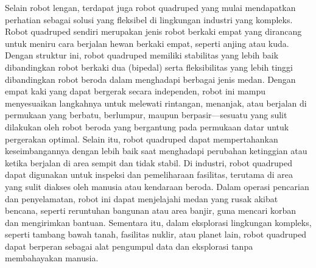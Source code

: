 Selain robot lengan, terdapat juga robot quadruped yang mulai mendapatkan perhatian sebagai
solusi yang fleksibel di lingkungan industri yang kompleks.
Robot quadruped sendiri merupakan jenis robot berkaki empat yang dirancang untuk meniru
cara berjalan hewan berkaki empat, seperti anjing atau kuda.
Dengan struktur ini, robot quadruped memiliki stabilitas yang lebih baik
dibandingkan robot berkaki dua (bipedal) serta fleksibilitas yang lebih tinggi
dibandingkan robot beroda dalam menghadapi berbagai jenis medan\parencite{LeiWu_doassfqrbog}.
Dengan empat kaki yang dapat bergerak secara independen, robot ini mampu menyesuaikan
langkahnya untuk melewati rintangan, menanjak, atau berjalan di permukaan yang berbatu,
berlumpur, maupun berpasir—sesuatu yang sulit dilakukan oleh robot beroda yang bergantung
pada permukaan datar untuk pergerakan optimal. Selain itu, robot quadruped dapat
mempertahankan keseimbangannya dengan lebih baik saat menghadapi perubahan ketinggian
atau ketika berjalan di area sempit dan tidak stabil.
Di industri, robot quadruped dapat digunakan untuk inspeksi dan pemeliharaan fasilitas,
terutama di area yang sulit diakses oleh manusia atau kendaraan beroda.
Dalam operasi pencarian dan penyelamatan, robot ini dapat menjelajahi medan yang rusak akibat bencana,
seperti reruntuhan bangunan atau area banjir, guna mencari korban dan mengirimkan bantuan.
Sementara itu, dalam eksplorasi lingkungan kompleks, seperti tambang bawah tanah,
fasilitas nuklir, atau planet lain, robot quadruped dapat berperan
sebagai alat pengumpul data dan eksplorasi tanpa membahayakan manusia.

